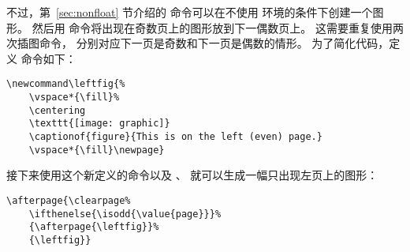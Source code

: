 不过，第~\ref{sec:nonfloat} 节介绍的  命令可以在不使用  环境的条件下创建一个图形。
然后用  命令将出现在奇数页上的图形放到下一偶数页上。
这需要重复使用两次插图命令，
分别对应下一页是奇数和下一页是偶数的情形。
为了简化代码，定义  命令如下：
\begin{lstlisting}
\newcommand\leftfig{%
	\vspace*{\fill}%
	\centering
	\texttt{[image: graphic]}
	\captionof{figure}{This is on the left (even) page.}
	\vspace*{\fill}\newpage}
\end{lstlisting}

接下来使用这个新定义的命令以及 、 就可以生成一幅只出现左页上的图形：
\begin{lstlisting}
\afterpage{\clearpage% 
	\ifthenelse{\isodd{\value{page}}}% 
	{\afterpage{\leftfig}}% 
	{\leftfig}}
\end{lstlisting}

